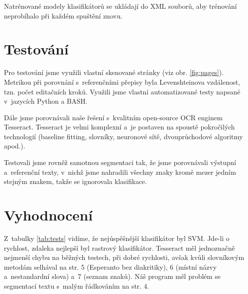 \documentclass[12pt]{article}
\begin{document}
Natrénované modely klasifikátorů se ukládají do XML souborů, aby trénování neprobíhalo při každém spuštění znovu.

\section{Testování}

Pro testování jsme využili vlastní skenované stránky (viz obr. \ref{fig:pages}). Metrikou
při porovnání s~referenčními přepisy byla Levenshteinova vzdálenost, tzn. počet editačních kroků. \cite{lev}
Využili jsme vlastní automatizované testy napsané v~jazycích Python a BASH.

Dále jsme porovnávali naše řešení s~kvalitním open-source OCR enginem Tesseract. \cite{tess} Tesseract
je velmi komplexní a~je postaven na spoustě pokročilých technologií (baseline fitting, slovníky, neuronové sítě,
dvouprůchodové algoritmy apod.). \cite{tess2}

Testovali jsme rovněž samotnou segmentaci tak, že jsme porovnávali výstupní a~referenční texty, v~nichž jsme
nahradili všechny znaky kromě mezer jedním stejným znakem, takže se ignorovala klasifikace.


\section{Vyhodnocení}

Z~tabulky \ref{tab:tests} vidíme, že nejúspěšnější klasifikátor byl SVM. Jde-li o rychlost, zdaleka nejlepší
byl rastrový klasifikátor. Tesseract měl jednoznačně nejmenší chybu na běžných testech, při dobré rychlosti,
avšak kvůli slovníkovým metodám selhával na str. 5 (Esperanto bez diakritiky), 6 (místní názvy a~nestandardní
slova) a~7 (seznam znaků). Náš program měl problém se segmentací textu s~malým řádkováním
na str. 4.
\end{document}
